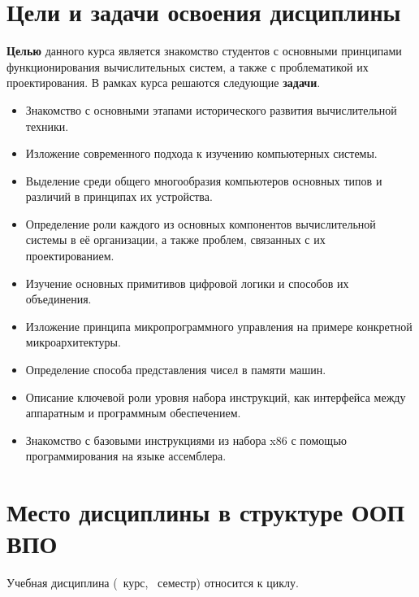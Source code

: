 






\section{Цели и задачи освоения дисциплины}

\textbf{Целью} данного курса является знакомство студентов с основными принципами функционирования вычислительных систем, а также с проблематикой их проектирования. В рамках курса решаются следующие \textbf{задачи}.
\begin{itemize}
	\item Знакомство с основными этапами исторического развития вычислительной техники.
	\item Изложение современного подхода к изучению компьютерных системы.
	\item Выделение среди общего многообразия компьютеров основных типов и различий в принципах их устройства.
	\item Определение роли каждого из основных компонентов вычислительной системы в её организации, а также проблем, связанных с их проектированием.
	\item Изучение основных примитивов цифровой логики и способов их объединения.
	\item Изложение принципа микропрограммного управления на примере конкретной микроархитектуры.
	\item Определение способа представления чисел в памяти машин.
	\item Описание ключевой роли уровня набора инструкций, как интерфейса между аппаратным и программным обеспечением.
	\item Знакомство с базовыми инструкциями из набора x86 с помощью программирования на языке ассемблера.
\end{itemize}

\section{Место дисциплины в структуре ООП ВПО}


	\ssect Учебная дисциплина \thecourse{}
(\theyearofstudy~курс, \theglobalterm~семестр) относится к  циклу.

